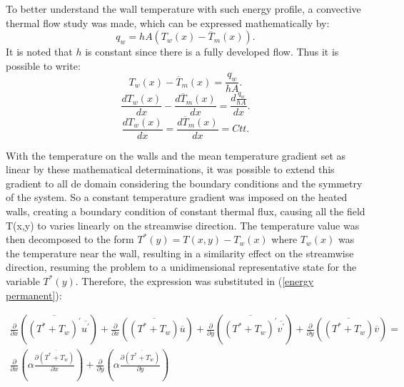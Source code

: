 \documentclass[10pt]{article} %
\begin{document}
To better understand the wall temperature with such energy profile, a convective thermal flow study was made, which can be expressed mathematically by:
\begin{equation}
q_w = h A \left( T_w(x) - \overline{T}_m(x)\right).
\end{equation}
It is noted that $h$ is constant since there is a fully developed flow. Thus it is possible to write:
\begin{equation}
T_w(x) - \overline{T}_m(x) = \frac{q_w}{hA}.
\end{equation}
\begin{equation}
\frac{d T_w(x)}{d x} - \frac{d \overline{T}_m(x)}{d x} = \frac{d \frac{q_w}{hA}}{dx}.
\end{equation}
\begin{equation}
\frac{d T_w(x)}{d x} = \frac{d \overline{T}_m(x)}{d x} = Ctt.
\end{equation}	

With the temperature on the walls and the mean temperature gradient set as linear by these mathematical determinations, it was possible to extend this gradient to all de domain considering the boundary conditions and the symmetry of the system. So a constant temperature gradient was imposed on the heated walls, creating a boundary condition of constant thermal flux, causing all the field T(x,y) to varies linearly on the streamwise direction. The temperature value was then decomposed to the form $ T^\ast(y) = T(x,y) - T_w(x) $ where $T_w(x)$ was the temperature near the wall, resulting in a similarity effect on the streamwise direction, resuming the problem to a unidimensional representative state for the variable $T^\ast(y)$. Therefore, the expression was substituted in (\ref{energy permanent}):



\begin{equation}
\begin{split}
\frac{\partial{}}{\partial{x}} \left(\overline{(T^\ast + T_w)^\prime} \overline{ u^\prime}\right) + \frac{\partial{}}{\partial{x}}\left(\overline{(T^\ast + T_w)} \overline{u}\right)+ 
\frac{\partial{}}{\partial{y}} \left(\overline{(T^\ast + T_w)^\prime} \overline{ v^\prime}\right) + \frac{\partial{}}{\partial{y}}\left(\overline{(T^\ast + T_w)} \overline{v}\right) = \\
{\frac{\partial{}}{\partial{x}}} \left(\alpha {\frac{\partial{\overline{(T^\ast + T_w)}}}{\partial{x}}} \right) +
{\frac{\partial{}}{\partial{y}}} \left(\alpha {\frac{\partial{\overline{(T^\ast + T_w)}}}{\partial{y}}} \right) 
\end{split}
\end{equation}
\end{document}
